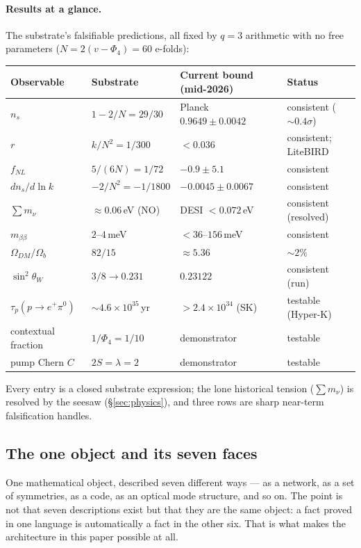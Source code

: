 \documentclass[11pt]{article}
\begin{document}
\paragraph{Results at a glance.} The substrate's falsifiable predictions, all
fixed by $q=3$ arithmetic with no free parameters ($N=2(v-\Phi_4)=60$ e-folds):
\begin{center}\small
\begin{tabular}{@{}llll@{}}
\toprule
Observable & Substrate & Current bound (mid-2026) & Status\\
\midrule
$n_s$ & $1-2/N=29/30$ & Planck $0.9649\pm0.0042$ & consistent ($\sim0.4\sigma$)\\
$r$ & $k/N^2=1/300$ & $<0.036$ & consistent; LiteBIRD\\
$f_{NL}$ & $5/(6N)=1/72$ & $-0.9\pm5.1$ & consistent\\
$dn_s/d\ln k$ & $-2/N^2=-1/1800$ & $-0.0045\pm0.0067$ & consistent\\
$\sum m_\nu$ & $\approx0.06$\,eV (NO) & DESI $<0.072$\,eV & consistent (resolved)\\
$m_{\beta\beta}$ & $2$--$4$\,meV & $<36$--$156$\,meV & consistent\\
$\Omega_{DM}/\Omega_b$ & $82/15$ & $\approx5.36$ & $\sim2\%$\\
$\sin^2\theta_W$ & $3/8\to0.231$ & $0.23122$ & consistent (run)\\
$\tau_p(p\!\to\! e^+\pi^0)$ & $\sim4.6\times10^{35}$\,yr & $>2.4\times10^{34}$ (SK) & testable (Hyper-K)\\
contextual fraction & $1/\Phi_4=1/10$ & demonstrator & testable\\
pump Chern $C$ & $2S=\lambda=2$ & demonstrator & testable\\
\bottomrule
\end{tabular}
\end{center}
Every entry is a closed substrate expression; the lone historical tension
($\sum m_\nu$) is resolved by the seesaw (\S\ref{sec:physics}), and three rows
are sharp near-term falsification handles.

\subsection{The one object and its seven faces}

\begin{plainbox}
One mathematical object, described seven different ways --- as a network, as a set
of symmetries, as a code, as an optical mode structure, and so on. The point is not that
seven descriptions exist but that they are the same object: a fact proved in one language
is automatically a fact in the other six. That is what makes the architecture in this paper
possible at all.
\end{plainbox}
\end{document}
